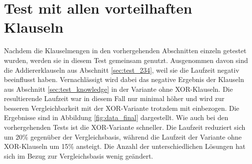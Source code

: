\section{Test mit allen vorteilhaften Klauseln} %
\label{sec:test_beste}

Nachdem die Klauselmengen in den vorhergehenden Abschnitten einzeln getestet wurden, werden sie in diesem Test gemeinsam genutzt.
Ausgenommen davon sind die Addiererklauseln aus Abschnitt \ref{sec:test_234}, weil sie die Laufzeit negativ beeinflusst haben.
Vernachlässigt wird dabei das negative Ergebnis der Klauseln aus Abschnitt \ref{sec:test_knowledge} in der Variante ohne XOR-Klauseln.
Die resultierende Laufzeit war in diesem Fall nur minimal höher und wird zur besseren Vergleichbarkeit mit der XOR-Variante trotzdem
mit einbezogen. Die Ergebnisse sind in Abbildung \ref{fig:data_final} dargestellt. Wie auch bei den vorhergehenden Tests ist die XOR-Variante
schneller. Die Laufzeit reduziert sich um 20\% gegenüber der Vergleichsbasis, während die Laufzeit der Variante ohne XOR-Klauseln um
15\% ansteigt. Die Anzahl der unterschiedlichen Lösungen hat sich im Bezug zur Vergleichsbasis wenig geändert.

